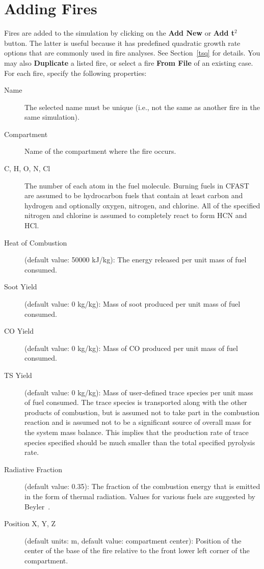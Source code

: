 \section{Adding Fires}
\label{info:FIRE}
\label{sec:fire_inputs}
Fires are added to the simulation by clicking on the {\bf Add New} or {\bf Add t$^2$} button. The latter is useful because it has predefined quadratic growth rate options that are commonly used in fire analyses. See Section~\ref{tsq} for details. You may also {\bf Duplicate} a listed fire, or select a fire {\bf From File} of an existing case. For each fire, specify the following properties:
\begin{description}
\item[Name] The selected name must be unique (i.e., not the same as another fire in the same simulation).
\item[Compartment] Name of the compartment where the fire occurs.
\item[C, H, O, N, Cl] The number of each atom in the fuel molecule. Burning fuels in CFAST are assumed to be hydrocarbon fuels that contain at least carbon and hydrogen and optionally oxygen, nitrogen, and chlorine. All of the specified nitrogen and chlorine is assumed to completely react to form HCN and HCl.
\item[Heat of Combustion] (default value: 50000 kJ/kg): The energy released per unit mass of fuel consumed.
\item[Soot Yield] (default value: 0 kg/kg): Mass of soot produced per unit mass of fuel consumed.
\item[CO Yield] (default value: 0 kg/kg): Mass of CO produced per unit mass of fuel consumed.
\item[TS Yield] (default value: 0 kg/kg): Mass of user-defined trace species per unit mass of fuel consumed. The trace species is transported along with the other products of combustion, but is assumed not to take part in the combustion reaction and is assumed not to be a significant source of overall mass for the system mass balance. This implies that the production rate of trace species specified should be much smaller than the total specified pyrolysis rate.
\item[Radiative Fraction] (default value: 0.35): The fraction of the combustion energy that is emitted in the form of thermal radiation. Values for various fuels are suggested by Beyler~\cite{Beyler2:SFPE}.
\item[Position X, Y, Z] (default units: m, default value: compartment center): Position of the center of the base of the fire relative to the front lower left corner of the compartment.

\end{description}
